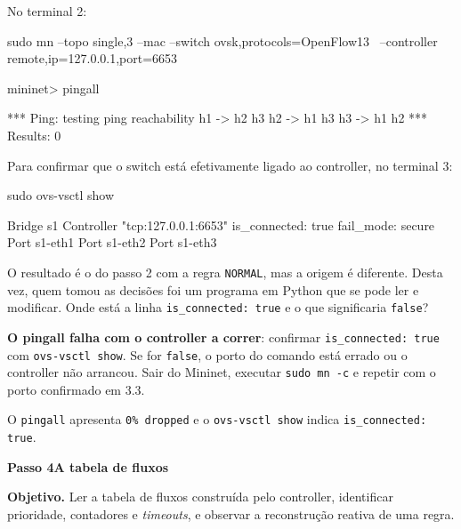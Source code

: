\documentclass[11pt,a4paper]{article}
\newcommand{\passo}[2]{%
  \clearpage
  \begin{tcolorbox}[colback=SageMuted, colframe=SageMuted, coltext=white,
    boxrule=0pt, arc=4pt, left=14pt, right=14pt, top=10pt, bottom=10pt,
    before skip=0pt, after skip=0.6cm]
  {\Large\bfseries Passo #1}\hfill{\large\bfseries #2}
  \end{tcolorbox}
}
\newcommand{\cmd}[1]{\texttt{#1}}
\begin{document}
No terminal 2:

\begin{terminal}
sudo mn --topo single,3 --mac --switch ovsk,protocols=OpenFlow13 \
  --controller remote,ip=127.0.0.1,port=6653
\end{terminal}

\begin{terminal}
mininet> pingall
\end{terminal}

\begin{saida}
*** Ping: testing ping reachability
h1 -> h2 h3
h2 -> h1 h3
h3 -> h1 h2
*** Results: 0%
\end{saida}

Para confirmar que o switch está efetivamente ligado ao controller, no terminal 3:

\begin{terminal}
sudo ovs-vsctl show
\end{terminal}

\begin{saida}
    Bridge s1
        Controller "tcp:127.0.0.1:6653"
            is_connected: true
        fail_mode: secure
        Port s1-eth1
        Port s1-eth2
        Port s1-eth3
\end{saida}

\begin{observe}
O resultado é o do passo 2 com a regra \cmd{NORMAL}, mas a origem é diferente. Desta vez, quem tomou as decisões foi um programa em Python que se pode ler e modificar. Onde está a linha \cmd{is\_connected: true} e o que significaria \cmd{false}?
\end{observe}

\begin{erro}
\textbf{O pingall falha com o controller a correr}: confirmar \cmd{is\_connected: true} com \cmd{ovs-vsctl show}. Se for \cmd{false}, o porto do comando está errado ou o controller não arrancou. Sair do Mininet, executar \cmd{sudo mn -c} e repetir com o porto confirmado em 3.3.
\end{erro}

\begin{feito}
O \cmd{pingall} apresenta \cmd{0\% dropped} e o \cmd{ovs-vsctl show} indica \cmd{is\_connected: true}.
\end{feito}

\passo{4}{A tabela de fluxos}

\textbf{Objetivo.} Ler a tabela de fluxos construída pelo controller, identificar prioridade, contadores e \emph{timeouts}, e observar a reconstrução reativa de uma regra.
\end{document}
